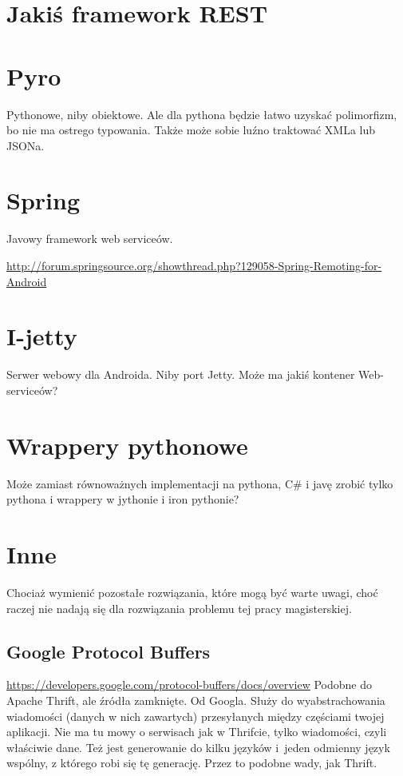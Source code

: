 \section{Jakiś framework REST}



\section{Pyro}
Pythonowe, niby obiektowe. Ale dla pythona będzie łatwo uzyskać polimorfizm, bo nie ma ostrego typowania. Także może sobie luźno traktować XMLa lub JSONa.

\section{Spring}
Javowy framework web serviceów.

\url{http://forum.springsource.org/showthread.php?129058-Spring-Remoting-for-Android}\\


\section{I-jetty}
Serwer webowy dla Androida. Niby port Jetty. Może ma jakiś kontener Web-serviceów?

\section{Wrappery pythonowe}
Może zamiast równoważnych implementacji na pythona, C\# i javę zrobić tylko pythona i wrappery w jythonie i iron pythonie?


\section{Inne}
Chociaż wymienić pozostałe rozwiązania, które mogą być warte uwagi, choć raczej nie nadają się dla rozwiązania problemu tej pracy magisterskiej.

\subsection{Google Protocol Buffers}
\url{https://developers.google.com/protocol-buffers/docs/overview}
Podobne do Apache Thrift, ale źródła zamknięte. Od Googla. Służy do wyabstrachowania wiadomości (danych w nich zawartych) przesyłanych między częściami twojej aplikacji.
Nie ma tu mowy o serwisach jak w Thrifcie, tylko wiadomości, czyli właściwie dane.
Też jest generowanie do kilku języków i~jeden odmienny język wspólny, z którego robi się tę generację. Przez to podobne wady, jak Thrift.

